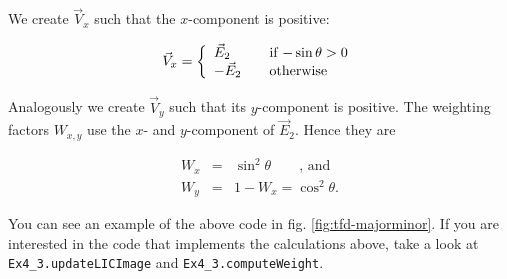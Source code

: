 \documentclass[a4paper,10pt,notitlepage]{scrartcl}
\begin{document}
We create $\vec{V}_x$ such that the $x$-component is positive:

\begin{equation}
 \vec{V}_x = \left \{  \begin{array}{l l}
                       \vec{E}_2 & \quad \text{if $-\sin \theta > 0$} \\
                       -\vec{E}_2 & \quad \text{otherwise}
                       \end{array} \right.
\end{equation}

Analogously we create $\vec{V}_y$ such that its $y$-component is positive. The
weighting factors $W_{x,y}$ use the $x$- and $y$-component of $\vec{E}_2$. Hence
they are

\begin{eqnarray}
 W_x &=& \sin^2 \theta \qquad \text{, and}\\
 W_y &=& 1 - W_x = \cos^2 \theta .
\end{eqnarray}

You can see an example of the above code in fig. \ref{fig:tfd-majorminor}. If
you are interested in the code that implements the calculations above, take a
look at \texttt{Ex4\_3.updateLICImage} and \texttt{Ex4\_3.computeWeight}.
\end{document}
